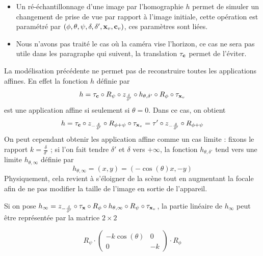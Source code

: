\begin{remarques}
\begin{itemize}
\item Un ré-échantillonnage d'une image par l'homographie  $h$ permet de simuler un changement de prise de vue par rapport à l'image initiale, cette opération est paramétré par  $(\phi,\theta,\psi,\delta,\delta',\mathbf{x}_v,\mathbf{c}_v)$, ces paramètres sont liées.
\item Nous n'avons pas traité le cas où la caméra vise l'horizon, ce cas ne sera pas utile dans les paragraphe qui suivent, la translation $\tau_{\mathbf{c}}$ permet de l'éviter.
\end{itemize}
\end{remarques}



\begin{remarque}
La modélisation précédente ne permet pas de reconstruire toutes les applications affines. En effet la fonction $h$ définie par 
\begin{equation*}
h = \tau_{\mathbf{c}}   \circ R_{\psi} \circ z_{\frac{\delta}{\delta'}} \circ h_{\theta,\delta'} \circ R_{\phi} \circ \tau_{\mathbf{x}_v}
\end{equation*}
est une application affine si seulement si $\theta=0$. Dans ce cas, on obtient  
\begin{equation*}
h= \tau_{\mathbf{c}} \circ z_{-\frac{\delta}{\delta'}} \circ R_{\phi+\psi} \circ \tau_{\mathbf{x}_{v}}
=\tau' \circ z_{-\frac{\delta}{\delta'}} \circ  R_{\phi+\psi}
\end{equation*}
On peut cependant obtenir les application affine comme un cas limite : fixons le rapport  $k=\frac{\delta}{\delta'}$ ; si l'on fait tendre $\delta'$ et $\delta$ vers $+\infty$, la fonction $h_{\theta,\delta'}$ tend vers une limite $h_{\theta,\infty}$ définie par
\begin{equation*}
h_{\theta,\infty}=(x,y)=(-\cos(\theta)x,-y)
\end{equation*}
Physiquement, cela revient à s'éloigner de la scène tout en augmentant la focale afin de ne pas modifier la taille de l'image en sortie de l'appareil.

Si on pose $h_\infty = z_{-\frac{\delta}{\delta'}} \circ \tau_{\mathbf{x}} \circ R_{\phi} \circ h_{\theta,\infty} \circ R_{\psi} \circ \tau_{\mathbf{x}_{v}}$, la partie linéaire de $h_{\infty}$ peut être représentée par la matrice $2\times2$

\begin{equation*}
R_{\psi} \cdot 
\begin{pmatrix}
-k\cos(\theta)&0\\
0&-k
\end{pmatrix}
\cdot R_{\phi}
\end{equation*}


\end{remarque}
